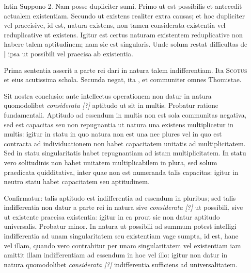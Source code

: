 \begin{otherlanguage*}{latin}
\pstart
Suppono 2. Nam posse dupliciter sumi. Primo ut est possibilis et antecedit actualem existentiam. Secundo ut existens realiter extra causas; et hoc dupliciter vel praecisive, id est, natura existens, non tamen considerata existentia vel reduplicative ut existens. Igitur est certus naturam existentem reduplicative non habere talem aptitudinem; nam sic est singularis. Unde solum restat difficultas de \textnormal{|} ipsa ut possibili vel praecisa ab existentia. 
\pend

\pstart
Prima sententia asserit a parte rei dari in natura talem indifferentiam. Ita \textsc{Scotus} et eius acutissima schola. Secunda negat, ita ,  et communiter omnes Thomistae. 
\pend

\pstart
Sit nostra conclusio:
ante intellectus operationem non datur in natura quomodolibet \emph{considerata [?]} aptitudo ut sit in multis. Probatur ratione fundamentali. Aptitudo ad essendum in multis non est sola communitas negativa, sed est capacitas seu non repugnantia ut natura una existens multiplicetur in multis:
igitur in statu in quo natura non est una nec plures vel in quo est contracta ad individuationem non habet capacitatem unitatis ad multiplicitatem. Sed in statu singularitatis habet repugnantiam ad istam multiplicitatem. In statu vero solitudinis non habet unitatem multiplicabilem in plura, sed solum praedicata quidditativa, inter quae non est numeranda talis capacitas:
igitur in neutro statu habet capacitatem seu aptitudinem. 
\pend

\pstart
Confirmatur:
talis aptitudo est indifferentia ad essendum in pluribus; sed talis indifferentia non datur a parte rei in natura sive \emph{considerata [?]} ut possibili, sive ut existente praecisa existentia:
igitur in ea prout sic non datur aptitudo universalis. Probatur minor. In natura ut possibili ad summum potest intelligi indifferentia ad unam singularitatem seu existentiam vage sumpta, id est, hanc vel illam, quando vero contrahitur per unam singularitatem vel existentiam iam amittit illam indifferentiam ad essendum in hoc vel illo:
igitur non datur in natura quomodolibet \emph{considerata [?]} indifferentia sufficiens ad universalitatem. 
\pend


\end{otherlanguage*}
